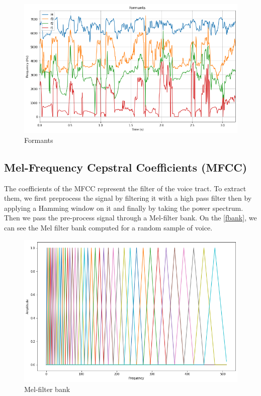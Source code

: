 \documentclass[]{article}
\begin{document}
\begin{figure}[H]
    \centering
    \caption{\label{formants}Formants}
    \includegraphics[scale=0.5]{images/formants.png}
\end{figure}

\subsection{Mel-Frequency Cepstral Coefficients (MFCC)}
The coefficients of the MFCC represent the filter of the voice tract. To extract them, we first preprocess the signal by filtering it with a
high pass filter then by applying a Hamming window on it and finally by taking the power spectrum. Then we pass the pre-process signal through
a Mel-filter bank. On the \autoref{fbank}, we can see the Mel filter bank computed for a random sample of voice.

\begin{figure}[H]
    \centering
    \caption{\label{fbank}Mel-filter bank}
    \includegraphics[scale=0.5]{images/fbank.png}
\end{figure}
\end{document}
